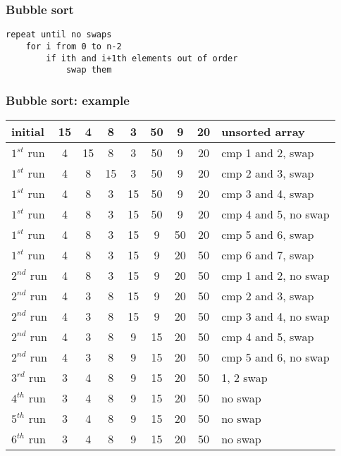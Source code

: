 \documentclass[newPxFont,sthlmFooter,nooffset]{beamer}
\begin{document}
\begin{frame}[t, fragile]
  \frametitle{Bubble sort}
  \begin{lstlisting}
repeat until no swaps
    for i from 0 to n-2
        if ith and i+1th elements out of order
            swap them
  \end{lstlisting}
\end{frame}
\begin{frame}[t]
  \frametitle{Bubble sort: example}
  \begin{tabular}{p{1.5cm}|| c | c | c | c | c | c | c |p{4cm}}
initial & 15 & 4  & 8  & 3  & 50 & 9 & 20 & unsorted array \\ \hline
$1^{st}$ run & \color{red} 4  & \color{red}15 & 8  & 3  & 50 & 9 & 20 & cmp 1 and 2, swap \pause\\  \hline
$1^{st}$ run & 4  & \color{red}8  & \color{red}15 & 3  & 50 & 9 & 20 & cmp 2 and 3, swap \pause \\ \hline
$1^{st}$ run & 4  & 8  & \color{red}3  & \color{red}15 & 50 & 9 & 20 & cmp 3 and 4, swap \pause \\ \hline
$1^{st}$ run & 4  & 8  & 3  & 15 & 50 & 9 & 20 & cmp 4 and 5, no swap \pause \\ \hline
$1^{st}$ run & 4  & 8  & 3  & 15 & \color{red}9 & \color{red}50 & 20 & cmp 5 and 6, swap \pause \\ \hline
$1^{st}$ run & 4  & 8  & 3  & 15 & 9 & \color{red}20 & \color{red}50 & cmp 6 and 7, swap \pause \\ \hline
$2^{nd}$ run & 4  & 8  & 3  & 15 & 9 & 20 & \color{blue}50 & cmp 1 and 2, no swap  \\ \hline
$2^{nd}$ run & 4  & \color{red}3  & \color{red}8  & 15 & 9 & 20 & \color{blue}50 & cmp 2 and 3,  swap  \\ \hline
$2^{nd}$ run & 4  & 3  & 8  & 15 & 9 & 20 & \color{blue}50 & cmp 3 and 4, no swap  \\ \hline
$2^{nd}$ run & 4  & 3  & 8  & \color{red}9  & \color{red}15 & 20 & \color{blue}50 & cmp 4 and 5, swap  \\ \hline
$2^{nd}$ run & 4  & 3  & 8  & 9  & 15 & \color{blue}20 & \color{blue}50 & cmp 5 and 6, no swap  \\ \hline
$3^{rd}$ run & \color{red}3  & \color{red}4  & 8  & 9  & \color{blue}15 & \color{blue}20 & \color{blue}50 & 1, 2 swap  \\ \hline
$4^{th}$ run & 3  & 4  & 8  & \color{blue}9  & \color{blue}15 & \color{blue}20 & \color{blue}50 & no swap  \\ \hline
$5^{th}$ run & 3  & 4  & \color{blue}8  & \color{blue}9  & \color{blue}15 & \color{blue}20 & \color{blue}50 & no swap  \\ \hline
$6^{th}$ run & 3  & \color{blue}4  & \color{blue}8  & \color{blue}9  & \color{blue}15 & \color{blue}20 & \color{blue}50 & no swap  \\ 
  \end{tabular}
\end{frame}
\end{document}
